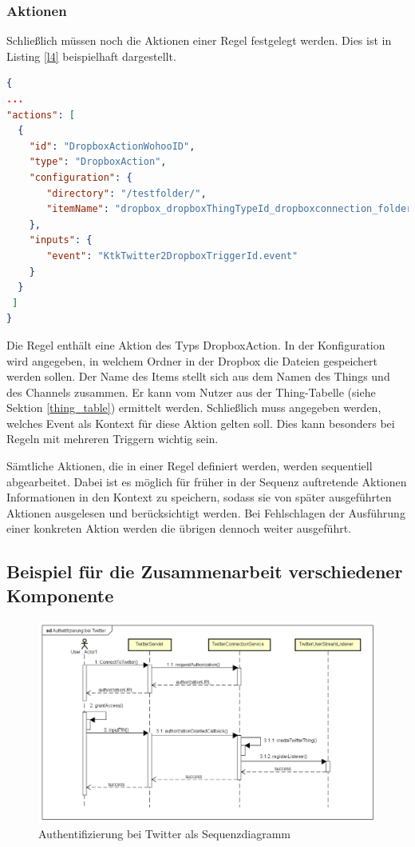 \subsubsection{Aktionen}
Schließlich müssen noch die Aktionen einer Regel festgelegt werden. Dies ist in Listing \ref{l4} beispielhaft dargestellt.
\begin{lstlisting}[language=json,firstnumber=1, caption=Die Liste der Aktionen einer Regel im JSON Format, captionpos=b, label=l4]
{
...
"actions": [
  {
	"id": "DropboxActionWohooID",
    "type": "DropboxAction",
    "configuration": {
       "directory": "/testfolder/",
       "itemName": "dropbox_dropboxThingTypeId_dropboxconnection_folder"
    },
    "inputs": {
       "event": "KtkTwitter2DropboxTriggerId.event"
    }
  }
 ]
}            
\end{lstlisting}
Die Regel enthält eine Aktion des Typs DropboxAction. In der Konfiguration wird angegeben, in welchem Ordner in der Dropbox die Dateien gespeichert werden sollen. Der Name des Items stellt sich aus dem Namen des Things und des Channels zusammen. Er kann vom Nutzer aus der Thing-Tabelle (siehe Sektion \ref{thing_table}) ermittelt werden. Schließlich muss angegeben werden, welches Event als Kontext für diese Aktion gelten soll. Dies kann besonders bei Regeln mit mehreren Triggern wichtig sein.

Sämtliche Aktionen, die in einer Regel definiert werden, werden sequentiell abgearbeitet. Dabei ist es möglich für früher in der Sequenz auftretende Aktionen Informationen in den Kontext zu speichern, sodass sie von später ausgeführten Aktionen ausgelesen und berücksichtigt werden. Bei Fehlschlagen der Ausführung einer konkreten Aktion werden die übrigen dennoch weiter ausgeführt.




\subsection{Beispiel für die Zusammenarbeit verschiedener Komponente}

\begin{figure}[h]
	\centering
	\includegraphics[angle=90, height=\textheight]{bilder/sequenceOAuth}
	\caption{Authentifizierung bei Twitter als Sequenzdiagramm}
	\label{fig:sequenceOauth}
\end{figure}

